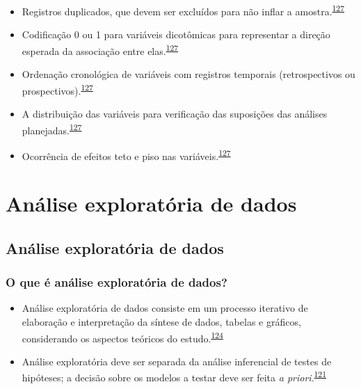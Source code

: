 \documentclass[
  a4paper,
]{book}
\begin{document}
\begin{itemize}
\item
  Registros duplicados, que devem ser excluídos para não inflar a amostra.\textsuperscript{\protect\hyperlink{ref-huebner2016}{127}}
\item
  Codificação 0 ou 1 para variáveis dicotômicas para representar a direção esperada da associação entre elas.\textsuperscript{\protect\hyperlink{ref-huebner2016}{127}}
\item
  Ordenação cronológica de variáveis com registros temporais (retrospectivos ou prospectivos).\textsuperscript{\protect\hyperlink{ref-huebner2016}{127}}
\item
  A distribuição das variáveis para verificação das suposições das análises planejadas.\textsuperscript{\protect\hyperlink{ref-huebner2016}{127}}
\item
  Ocorrência de efeitos teto e piso nas variáveis.\textsuperscript{\protect\hyperlink{ref-huebner2016}{127}}
\end{itemize}

\hypertarget{analise-exploratoria-dados}{%
\chapter{\texorpdfstring{\textbf{Análise exploratória de dados}}{Análise exploratória de dados}}\label{analise-exploratoria-dados}}

\hypertarget{analise-exploratoria}{%
\section{Análise exploratória de dados}\label{analise-exploratoria}}

\hypertarget{o-que-uxe9-anuxe1lise-exploratuxf3ria-de-dados}{%
\subsection{O que é análise exploratória de dados?}\label{o-que-uxe9-anuxe1lise-exploratuxf3ria-de-dados}}

\begin{itemize}
\item
  Análise exploratória de dados consiste em um processo iterativo de elaboração e interpretação da síntese de dados, tabelas e gráficos, considerando os aspectos teóricos do estudo.\textsuperscript{\protect\hyperlink{ref-Ferketich1986}{124}}
\item
  Análise exploratória deve ser separada da análise inferencial de testes de hipóteses; a decisão sobre os modelos a testar deve ser feita \emph{a priori}.\textsuperscript{\protect\hyperlink{ref-zuur2009}{121}}
\end{itemize}
\end{document}
